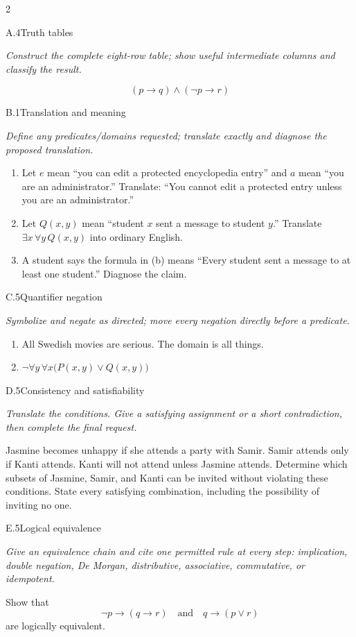 \documentclass[9pt]{extarticle}
\begin{document}
\CoreWorkArea
\FormBreak
{}
\begin{multicols}{2}
\begin{CoreProblem}{A.4}{Truth tables}
{\scriptsize\textit{Construct the complete eight-row table; show useful intermediate columns and classify the result.}\par}
\[
  (p\to q)\land(\neg p\to r)
\]
\end{CoreProblem}
\begin{CoreProblem}{B.1}{Translation and meaning}
{\scriptsize\textit{Define any predicates/domains requested; translate exactly and diagnose the proposed translation.}\par}
\begin{enumerate}[label=(\alph*)]
  \item Let $e$ mean ``you can edit a protected encyclopedia entry'' and $a$
        mean ``you are an administrator.'' Translate: ``You cannot edit a
        protected entry unless you are an administrator.''
  \item Let $Q(x,y)$ mean ``student $x$ sent a message to student $y$.''
        Translate $\exists x\,\forall y\,Q(x,y)$ into ordinary English.
  \item A student says the formula in (b) means ``Every student sent a message
        to at least one student.'' Diagnose the claim.
\end{enumerate}
\end{CoreProblem}
\begin{CoreProblem}{C.5}{Quantifier negation}
{\scriptsize\textit{Symbolize and negate as directed; move every negation directly before a predicate.}\par}
\begin{enumerate}[label=(\alph*)]
  \item All Swedish movies are serious. The domain is all things.
  \item $\neg\forall y\,\forall x\bigl(P(x,y)\lor Q(x,y)\bigr)$
\end{enumerate}
\end{CoreProblem}
\columnbreak
\begin{CoreProblem}{D.5}{Consistency and satisfiability}
{\scriptsize\textit{Translate the conditions. Give a satisfying assignment or a short contradiction, then complete the final request.}\par}
Jasmine becomes unhappy if she attends a party with Samir. Samir attends only
if Kanti attends. Kanti will not attend unless Jasmine attends. Determine which
subsets of Jasmine, Samir, and Kanti can be invited without violating these
conditions. State every satisfying combination, including the possibility of
inviting no one.
\end{CoreProblem}
\begin{CoreProblem}{E.5}{Logical equivalence}
{\scriptsize\textit{Give an equivalence chain and cite one permitted rule at every step: implication, double negation, De Morgan, distributive, associative, commutative, or idempotent.}\par}
Show that
\[
  \neg p\to(q\to r)
  \quad\text{and}\quad
  q\to(p\lor r)
\]
are logically equivalent.
\end{CoreProblem}
\end{multicols}
\end{document}
